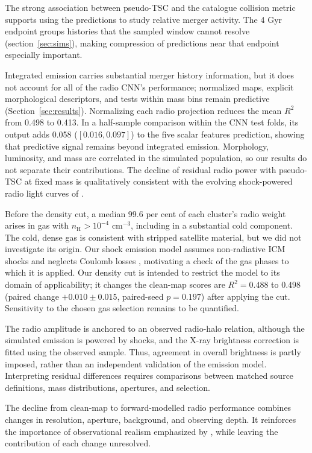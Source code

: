 The strong association between pseudo-TSC and the catalogue collision metric supports using the predictions to study relative merger activity.
The 4 Gyr endpoint groups histories that the sampled window cannot resolve (section~\ref{sec:sims}), making compression of predictions near that endpoint especially important.

Integrated emission carries substantial merger history information, but it does not account for all of the radio CNN's performance; normalized maps, explicit morphological descriptors, and tests within mass bins remain predictive (Section~\ref{sec:results}).
Normalizing each radio projection reduces the mean $R^2$ from 0.498 to 0.413.
In a half-sample comparison within the CNN test folds, its output adds 0.058 ($[0.016, 0.097]$) to the five scalar features prediction, showing that predictive signal remains beyond integrated emission.
Morphology, luminosity, and mass are correlated in the simulated population, so our results do not separate their contributions. 
The decline of residual radio power with pseudo-TSC at fixed mass is qualitatively consistent with the evolving shock-powered radio light curves of \citet{Nuza2024}.

Before the density cut, a median 99.6 per cent of each cluster's radio weight arises in gas with $n_\text{H} > 10^{-4}$ cm$^{-3}$, including in a substantial cold component.
The cold, dense gas is consistent with stripped satellite material, but we did not investigate its origin.
Our shock emission model assumes non-radiative ICM shocks and neglects Coulomb losses \citep{HoeftBruggen2007}, motivating a check of the gas phases to which it is applied.
Our density cut is intended to restrict the model to its domain of applicability; it changes the clean-map scores are $R^2 = 0.488$ to $0.498$ (paired change $+0.010\pm 0.015$, paired-seed $p=0.197$) after applying the cut.
Sensitivity to the chosen gas selection remains to be quantified.

The radio amplitude is anchored to an observed radio-halo relation, although the simulated emission is powered by shocks, and the X-ray brightness correction is fitted using the observed sample.
Thus, agreement in overall brightness is partly imposed, rather than an independent validation of the emission model.
Interpreting residual differences requires comparisons between matched source definitions, mass distributions, apertures, and selection.

The decline from clean-map to forward-modelled radio performance combines changes in resolution, aperture, background, and observing depth.
It reinforces the importance of observational realism emphasized by \citet{Bottrell2019}, while leaving the contribution of each change unresolved.

